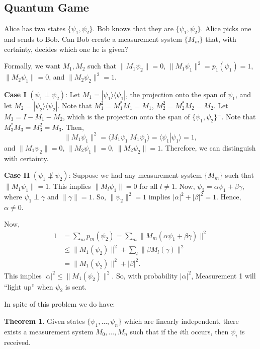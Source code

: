 \documentclass[12pt]{article}
\theoremstyle{definition}
\newtheorem*{theorem}{Theorem}
\newcommand{\ketbra}[2]{|#1\rangle\langle #2|}
\newcommand{\norm}[1]{\|#1\|}
\begin{document}
\subsection{Quantum Game}

Alice has two states $\{\psi_1, \psi_2\}$. Bob knows that they are $\{\psi_1, \psi_2\}$. Alice picks one and sends to Bob. Can Bob create a measurement system $\{M_m\}$ that, with certainty, decides which one he is given?

Formally, we want $M_1, M_2$ such that $\norm{M_1\psi_2} = 0$, $\norm{M_1\psi_1}^2 = p_1(\psi_1) = 1$, $\norm{M_2\psi_1} = 0$, and $\norm{M_2\psi_2}^2 = 1$.

\textbf{Case I} $(\psi_1 \perp \psi_2)$: Let $M_1 = \ketbra{\psi_1}{\psi_1}$, the projection onto the span of $\psi_1$, and let $M_2 = \ketbra{\psi_2}{\psi_2}$. Note that $M_1^2 = M_1^*M_1 = M_1$, $M_2^2 = M_2^*M_2 = M_2$. Let $M_3 = I - M_1 - M_2$, which is the projection onto the span of $\{\psi_1,\psi_2\}^\perp$. Note that $M_3^*M_3 = M_3^2 = M_3$. Then,
\[
\norm{M_1\psi_1}^2 = \langle M_1\psi_1|M_1\psi_1\rangle = \langle\psi_1|\psi_1\rangle = 1,
\]
and $\norm{M_1\psi_2} = 0$, $\norm{M_2\psi_1} = 0$, $\norm{M_2\psi_2} = 1$. Therefore, we can distinguish with certainty.

\textbf{Case II} $(\psi_1 \not\perp \psi_2)$: Suppose we had any measurement system $\{M_m\}$ such that $\norm{M_1\psi_1} = 1$. This implies $\norm{M_l\psi_1} = 0$ for all $l \neq 1$. Now, $\psi_2 = \alpha\psi_1 + \beta\gamma$, where $\psi_1 \perp \gamma$ and $\norm{\gamma} = 1$. So, $\norm{\psi_2}^2 = 1$ implies $|\alpha|^2 + |\beta|^2 = 1$. Hence, $\alpha \neq 0$.

Now,
\begin{align*}
1 &= \sum_m p_m(\psi_2) = \sum_m \norm{M_m(\alpha\psi_1+\beta\gamma)}^2 \\
&\leq \norm{M_1(\psi_2)}^2 + \sum_l \norm{\beta M_l(\gamma)}^2 \\
&= \norm{M_1(\psi_2)}^2 + |\beta|^2.
\end{align*}
This implies $|\alpha|^2 \leq \norm{M_1(\psi_2)}^2$. So, with probability $|\alpha|^2$, Measurement 1 will ``light up'' when $\psi_2$ is sent.

In spite of this problem we do have:

\begin{theorem}
Given states $\{\psi_1,\ldots,\psi_n\}$ which are linearly independent, there exists a measurement system $M_0,\ldots,M_n$ such that if the $i$th occurs, then $\psi_i$ is received.
\end{theorem}
\end{document}
